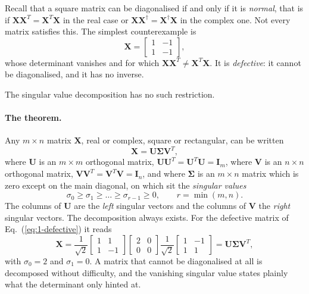 Recall that a square matrix can be diagonalised if and only if it is
\emph{normal}, that is if $\bm{X}\bm{X}^{T}=\bm{X}^{T}\bm{X}$ in the real case
or $\bm{X}\bm{X}^{\dagger}=\bm{X}^{\dagger}\bm{X}$ in the complex one.  Not
every matrix satisfies this.  The simplest counterexample is
\begin{equation}
  \bm{X} = \begin{bmatrix} 1 & -1\\ 1 & -1\end{bmatrix},
  \label{eq:1-defective}
\end{equation}
whose determinant vanishes and for which
$\bm{X}\bm{X}^{T}\neq\bm{X}^{T}\bm{X}$.  It is \emph{defective}: it cannot be
diagonalised, and it has no inverse.

The singular value decomposition has no such restriction.

\paragraph{The theorem.}
Any $m\times n$ matrix $\bm{X}$, real or complex, square or rectangular, can
be written
\begin{equation}
  \bm{X} = \bm{U}\bm{\Sigma}\bm{V}^{T},
  \label{eq:1-svd}
\end{equation}
where $\bm{U}$ is an $m\times m$ orthogonal matrix,
$\bm{U}\bm{U}^{T}=\bm{U}^{T}\bm{U}=\bm{I}_m$, where $\bm{V}$ is an $n\times n$
orthogonal matrix, $\bm{V}\bm{V}^{T}=\bm{V}^{T}\bm{V}=\bm{I}_n$, and where
$\bm{\Sigma}$ is an $m\times n$ matrix which is zero except on the main
diagonal, on which sit the \emph{singular values}
\begin{equation}
  \sigma_0 \ge \sigma_1 \ge \dots \ge \sigma_{r-1} \ge 0,
  \qquad r=\min(m,n).
  \label{eq:1-singvals}
\end{equation}
The columns of $\bm{U}$ are the \emph{left} singular vectors and the columns
of $\bm{V}$ the \emph{right} singular vectors.  The decomposition always
exists.  For the defective matrix of Eq.~(\ref{eq:1-defective}) it reads
\begin{equation}
  \bm{X}
   = \frac{1}{\sqrt{2}}\begin{bmatrix}1&1\\1&-1\end{bmatrix}
     \begin{bmatrix}2&0\\0&0\end{bmatrix}
     \frac{1}{\sqrt{2}}\begin{bmatrix}1&-1\\1&1\end{bmatrix}
   = \bm{U}\bm{\Sigma}\bm{V}^{T},
  \label{eq:1-defectivesvd}
\end{equation}
with $\sigma_0=2$ and $\sigma_1=0$.  A matrix that cannot be diagonalised at
all is decomposed without difficulty, and the vanishing singular value states
plainly what the determinant only hinted at.


